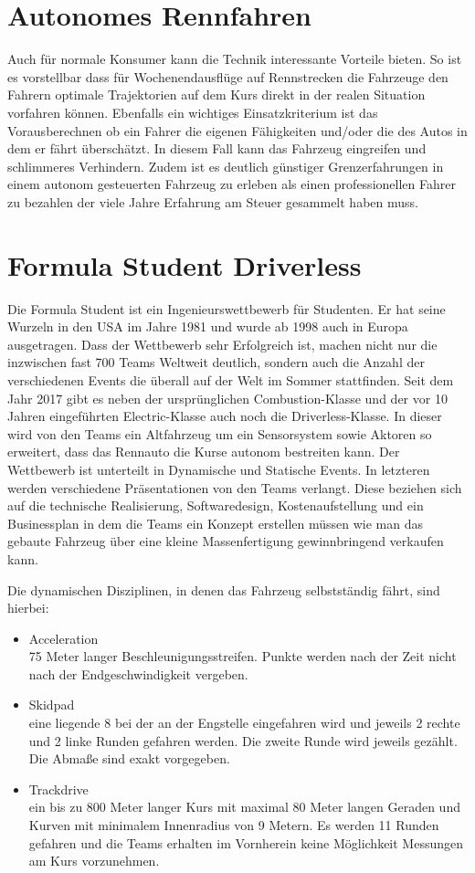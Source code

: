 \documentclass{like}
\begin{document}
\section{Autonomes Rennfahren}


Auch für normale Konsumer kann die Technik interessante Vorteile bieten. So ist es vorstellbar dass für Wochenendausflüge auf Rennstrecken die Fahrzeuge den Fahrern optimale Trajektorien auf dem Kurs direkt in der realen Situation vorfahren können. Ebenfalls ein wichtiges Einsatzkriterium ist das Vorausberechnen ob ein Fahrer die eigenen Fähigkeiten und/oder die des Autos in dem er fährt überschätzt. In diesem Fall kann das Fahrzeug eingreifen und schlimmeres Verhindern. Zudem ist es deutlich günstiger Grenzerfahrungen in einem autonom gesteuerten Fahrzeug zu erleben als einen professionellen Fahrer zu bezahlen der viele Jahre Erfahrung am Steuer gesammelt haben muss.

\section{Formula Student Driverless}

Die Formula Student ist ein Ingenieurswettbewerb für Studenten. Er hat seine Wurzeln in den USA im Jahre 1981 und wurde ab 1998 auch in Europa ausgetragen.
Dass der Wettbewerb sehr Erfolgreich ist, machen nicht nur die inzwischen fast 700 Teams Weltweit \cite{FsWorldRank:1} deutlich, sondern auch die Anzahl der verschiedenen Events die überall auf der Welt im Sommer stattfinden. Seit dem Jahr 2017 gibt es neben der ursprünglichen Combustion-Klasse und der vor 10 Jahren eingeführten Electric-Klasse auch noch die Driverless-Klasse.
In dieser wird von den Teams ein Altfahrzeug um ein Sensorsystem sowie Aktoren so erweitert, dass das Rennauto die Kurse autonom bestreiten kann.
Der Wettbewerb ist unterteilt in Dynamische und Statische Events. In letzteren werden verschiedene Präsentationen von den Teams verlangt. Diese beziehen sich auf die technische Realisierung, Softwaredesign, Kostenaufstellung und ein Businessplan in dem die Teams ein Konzept erstellen müssen wie man das gebaute Fahrzeug über eine kleine Massenfertigung gewinnbringend verkaufen kann.

Die dynamischen Disziplinen, in denen das Fahrzeug selbstständig fährt, sind hierbei:
\begin{itemize}
	\item Acceleration \\ 75 Meter langer Beschleunigungsstreifen. Punkte werden nach der Zeit nicht nach der Endgeschwindigkeit vergeben.
	\item Skidpad \\ eine liegende 8 bei der an der Engstelle eingefahren wird und jeweils 2 rechte und 2 linke Runden gefahren werden. Die zweite Runde wird jeweils gezählt. Die Abmaße sind exakt vorgegeben.
	\item Trackdrive \\ ein bis zu 800 Meter langer Kurs mit maximal 80 Meter langen Geraden und Kurven mit minimalem Innenradius von 9 Metern. Es werden 11 Runden gefahren und die Teams erhalten im Vornherein keine Möglichkeit Messungen am Kurs vorzunehmen.
\end{itemize}
\end{document}
